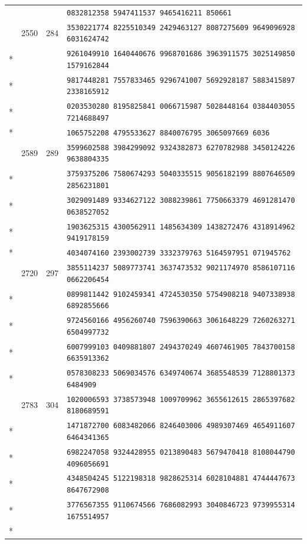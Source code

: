 \documentclass[10pt]{article}
\begin{document}
\begin{longtable}{@{}r@{\quad}r@{\quad}r@{\quad}l@{}}
 & &  & \texttt{0832812358 5947411537 9465416211 850661}\\
\addlinespace[2pt]
65 & 2550 & 284 & \texttt{3530221774 8225510349 2429463127 8087275609 9649096928 6031624742}\\*
 & &  & \texttt{9261049910 1640440676 9968701686 3963911575 3025149850 1579162844}\\*
 & &  & \texttt{9817448281 7557833465 9296741007 5692928187 5883415897 2338165912}\\*
 & &  & \texttt{0203530280 8195825841 0066715987 5028448164 0384403055 7214688497}\\*
 & &  & \texttt{1065752208 4795533627 8840076795 3065097669 6036}\\
\addlinespace[2pt]
66 & 2589 & 289 & \texttt{3599602588 3984299092 9324382873 6270782988 3450124226 9638804335}\\*
 & &  & \texttt{3759375206 7580674293 5040335515 9056182199 8807646509 2856231801}\\*
 & &  & \texttt{3029091489 9334627122 3088239861 7750663379 4691281470 0638527052}\\*
 & &  & \texttt{1903625315 4300562911 1485634309 1438272476 4318914962 9419178159}\\*
 & &  & \texttt{4034074160 2393002739 3332379763 5164597951 071945762}\\
\addlinespace[2pt]
67 & 2720 & 297 & \texttt{3855114237 5089773741 3637473532 9021174970 8586107116 0662206454}\\*
 & &  & \texttt{0899811442 9102459341 4724530350 5754908218 9407338938 6892855666}\\*
 & &  & \texttt{9724560166 4956260740 7596390663 3061648229 7260263271 6504997732}\\*
 & &  & \texttt{6007999103 0409881807 2494370249 4607461905 7843700158 6635913362}\\*
 & &  & \texttt{0578308233 5069034576 6349740674 3685548539 7128801373 6484909}\\
\addlinespace[2pt]
68 & 2783 & 304 & \texttt{1020006593 3738573948 1009709962 3655612615 2865397682 8180689591}\\*
 & &  & \texttt{1471872700 6083482066 8246403006 4989307469 4654911607 6464341365}\\*
 & &  & \texttt{6982247058 9324428955 0213890483 5679470418 8108044790 4096056691}\\*
 & &  & \texttt{4348504245 5122198318 9828625314 6028104881 4744447673 8647672908}\\*
 & &  & \texttt{3776567355 9110674566 7686082993 3040846723 9739955314 1675514957}\\*

\end{longtable}
\end{document}
